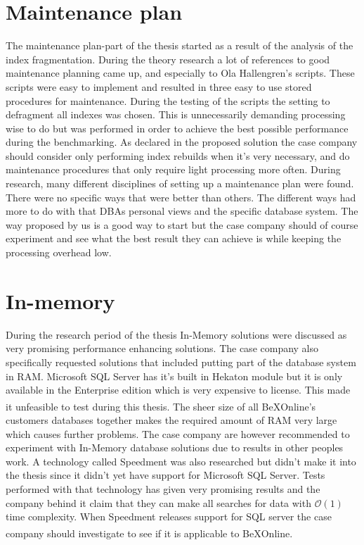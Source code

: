 \documentclass{cslthse-msc}
\newcommand{\bex}{BeX\textsuperscript{\textregistered}}
\begin{document}
\section{Maintenance plan}
The maintenance plan-part of the thesis started as a result of the analysis of the index fragmentation. During the theory research a lot of references to good maintenance planning came up, and especially to Ola Hallengren's scripts. These scripts were easy to implement and resulted in three easy to use stored procedures for maintenance. During the testing of the scripts the setting to defragment all indexes was chosen. This is unnecessarily demanding processing wise to do but was performed in order to achieve the best possible performance during the benchmarking. As declared in the proposed solution the case company should consider only performing index rebuilds when it's very necessary, and do maintenance procedures that only require light processing more often. During research, many different disciplines of setting up a maintenance plan were found. There were no specific ways that were better than others. The different ways had more to do with that DBAs personal views and the specific database system. The way proposed by us is a good way to start but the case company should of course experiment and see what the best result they can achieve is while keeping the processing overhead low. 

\section{In-memory}
During the research period of the thesis In-Memory solutions were discussed as very promising performance enhancing solutions. The case company also specifically requested solutions that included putting part of the database system in RAM. Microsoft SQL Server has it's built in Hekaton module but it is only available in the Enterprise edition which is very expensive to license. This made it unfeasible to test during this thesis. The sheer size of all \bex Online's customers databases together makes the required amount of RAM very large which causes further problems. The case company are however recommended to experiment with In-Memory database solutions due to results in other peoples work. A technology called Speedment was also researched but didn't make it into the thesis since it didn't yet have support for Microsoft SQL Server. Tests performed with that technology has given very promising results and the company behind it claim that they can make all searches for data with $\mathcal{O}(1)$ time complexity. When Speedment releases support for SQL server the case company should investigate to see if it is applicable to \bex Online.
\end{document}
